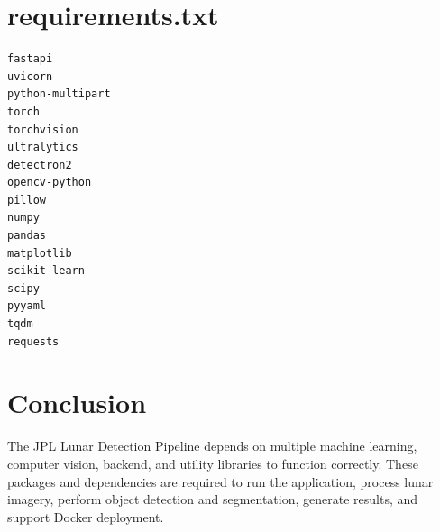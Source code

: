 \documentclass[12pt]{article}
\begin{document}
\section{requirements.txt}

\begin{verbatim}
fastapi
uvicorn
python-multipart
torch
torchvision
ultralytics
detectron2
opencv-python
pillow
numpy
pandas
matplotlib
scikit-learn
scipy
pyyaml
tqdm
requests
\end{verbatim}

\section{Conclusion}

The JPL Lunar Detection Pipeline depends on multiple machine learning,
computer vision, backend, and utility libraries to function correctly.
These packages and dependencies are required to run the application,
process lunar imagery, perform object detection and segmentation,
generate results, and support Docker deployment.
\end{document}
